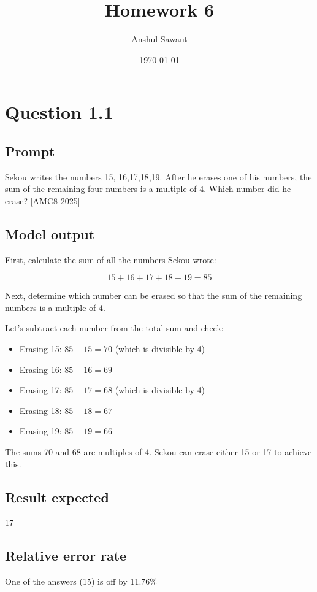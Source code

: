 \documentclass[11pt]{article}
\author{Anshul Sawant}
\date{\today}
\title{Homework 6}
\begin{document}
\maketitle
\tableofcontents


\section{Question 1.1}
\label{sec:org137cbab}
\subsection{Prompt}
\label{sec:org27d7cfd}
Sekou writes the numbers 15, 16,17,18,19. After he erases one of his numbers, the sum of the remaining four numbers is a multiple of 4. Which number did he erase? [AMC8 2025]
\subsection{Model output}
\label{sec:org7ffe315}
First, calculate the sum of all the numbers Sekou wrote:

\[ 
15 + 16 + 17 + 18 + 19 = 85 
\]

Next, determine which number can be erased so that the sum of the remaining numbers is a multiple of 4. 

Let's subtract each number from the total sum and check:

\begin{itemize}
\item Erasing 15: \(85 - 15 = 70\) (which is divisible by 4)
\item Erasing 16: \(85 - 16 = 69\)
\item Erasing 17: \(85 - 17 = 68\) (which is divisible by 4)
\item Erasing 18: \(85 - 18 = 67\)
\item Erasing 19: \(85 - 19 = 66\)
\end{itemize}

The sums 70 and 68 are multiples of 4. Sekou can erase either 15 or 17 to achieve this.

\subsection{Result expected}
\label{sec:org1c31651}
17

\subsection{Relative error rate}
\label{sec:orgc027c07}
One of the answers (15) is off by 11.76\%
\end{document}
